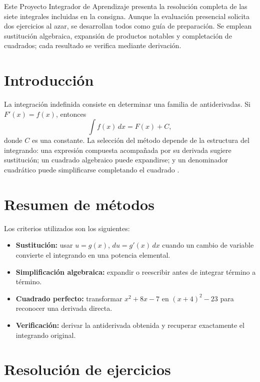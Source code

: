 \begin{abstractd}
Este Proyecto Integrador de Aprendizaje presenta la resolución completa de las siete integrales incluidas en la consigna. Aunque la evaluación presencial solicita dos ejercicios al azar, se desarrollan todos como guía de preparación. Se emplean sustitución algebraica, expansión de productos notables y completación de cuadrados; cada resultado se verifica mediante derivación.
\end{abstractd}

\templateIndex

\section{Introducción}
La integración indefinida consiste en determinar una familia de antiderivadas. Si $F'(x)=f(x)$, entonces
\[
 \int f(x)\,dx=F(x)+C,
\]
donde $C$ es una constante. La selección del método depende de la estructura del integrando: una expresión compuesta acompañada por su derivada sugiere sustitución; un cuadrado algebraico puede expandirse; y un denominador cuadrático puede simplificarse completando el cuadrado \citep{stewart2016calculus,thomas2018calculus}.

\section{Resumen de métodos}
Los criterios utilizados son los siguientes:
\begin{itemize}
  \item \textbf{Sustitución:} usar $u=g(x)$, $du=g'(x)\,dx$ cuando un cambio de variable convierte el integrando en una potencia elemental.
  \item \textbf{Simplificación algebraica:} expandir o reescribir antes de integrar término a término.
  \item \textbf{Cuadrado perfecto:} transformar $x^2+8x-7$ en $(x+4)^2-23$ para reconocer una derivada directa.
  \item \textbf{Verificación:} derivar la antiderivada obtenida y recuperar exactamente el integrando original.
\end{itemize}

\section{Resolución de ejercicios}


